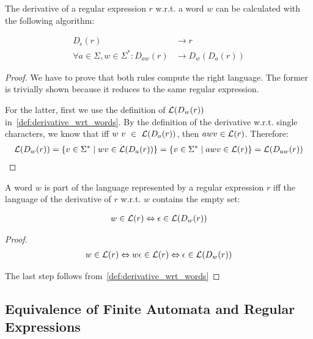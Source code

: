 \begin{theorem}
    The derivative of a regular expression $r$ w.r.t. a word $w$ can be calculated with the following algorithm:

    \begin{align}
        D_\epsilon(r) &\rightarrow r \\
        \forall a \in \Sigma, w \in \Sigma^\ast: D_{a w}(r) &\rightarrow D_w(D_a(r))
    \end{align}
\end{theorem}

\begin{proof}
    We have to prove that both rules compute the right language.
    The former is trivially shown because it reduces to the same regular expression.

    For the latter, first we use the definition of $\mathcal{L}(D_w(r))$ in~\ref{def:derivative_wrt_words}.
    By the definition of the derivative w.r.t. single characters,
    we know that iff $w~v~\in~\mathcal{L}(D_a(r))$, then $a w v \in \mathcal{L}(r)$.
    Therefore:
    \begin{align}
        \mathcal{L}(D_w(r))
            = \{ v \in \Sigma^\ast \mid w v \in \mathcal{L}(D_a(r)) \}
            = \{ v \in \Sigma^\ast \mid a w v \in \mathcal{L}(r) \}
            = \mathcal{L}(D_{a w}(r))
    \end{align}
\end{proof}

\begin{theorem}
    A word $w$ is part of the language represented by a regular expression $r$ iff
    the language of the derivative of $r$ w.r.t. $w$ contains the empty set:

    \begin{align}
        w \in \mathcal{L}(r) \Leftrightarrow \epsilon \in \mathcal{L}(D_w(r))
    \end{align}
\end{theorem}

\begin{proof}
    \begin{align}
        w \in \mathcal{L}(r) \Leftrightarrow w \epsilon \in \mathcal{L}(r) \Leftrightarrow \epsilon \in \mathcal{L}(D_w(r))
    \end{align}

    The last step follows from~\ref{def:derivative_wrt_words}
\end{proof}

\subsection{Equivalence of Finite Automata and Regular Expressions}

